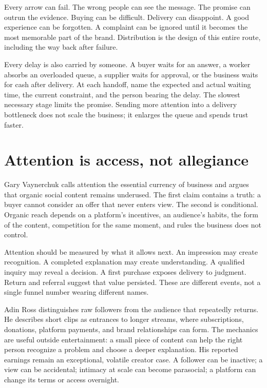 Every arrow can fail. The wrong people can see the message. The promise can
outrun the evidence. Buying can be difficult. Delivery can disappoint. A good
experience can be forgotten. A complaint can be ignored until it becomes the
most memorable part of the brand. Distribution is the design of this entire
route, including the way back after failure.

Every delay is also carried by someone. A buyer waits for an answer, a worker
absorbs an overloaded queue, a supplier waits for approval, or the business
waits for cash after delivery. At each handoff, name the expected and actual
waiting time, the current constraint, and the person bearing the delay. The
slowest necessary stage limits the promise. Sending more attention into a
delivery bottleneck does not scale the business; it enlarges the queue and
spends trust faster.

\section{Attention is access, not allegiance}

Gary Vaynerchuk calls attention the essential currency of business and argues
that organic social content remains underused. The first claim contains a
truth: a buyer cannot consider an offer that never enters view. The second is
conditional. Organic reach depends on a platform's incentives, an audience's
habits, the form of the content, competition for the same moment, and rules the
business does not control.

Attention should be measured by what it allows next. An impression may create
recognition. A completed explanation may create understanding. A qualified
inquiry may reveal a decision. A first purchase exposes delivery to judgment.
Return and referral suggest that value persisted. These are different events,
not a single funnel number wearing different names.

Adin Ross distinguishes raw followers from the audience that repeatedly
returns. He describes short clips as entrances to longer streams, where
subscriptions, donations, platform payments, and brand relationships can form.
The mechanics are useful outside entertainment: a small piece of content can
help the right person recognize a problem and choose a deeper explanation.
His reported earnings remain an exceptional, volatile creator case. A follower
can be inactive; a view can be accidental; intimacy at scale can become
parasocial; a platform can change its terms or access overnight.


